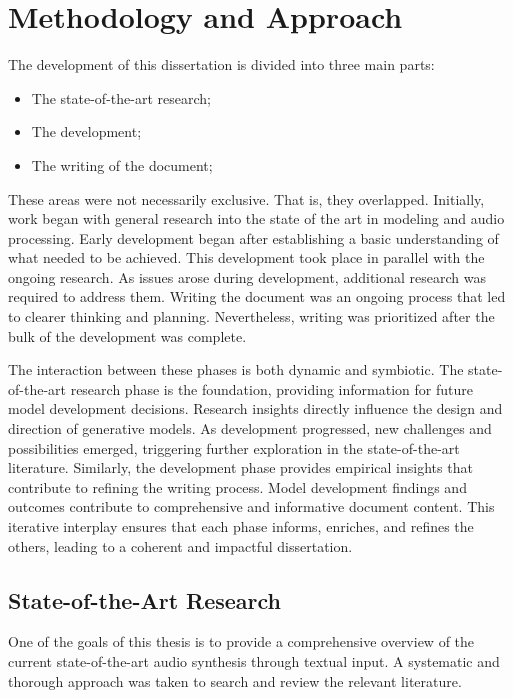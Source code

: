\section{Methodology and Approach} \label{sec:sol-approach}
 
The development of this dissertation is divided into three main parts:

\begin{itemize}
    \item The state-of-the-art research;
    \item The development;
    \item The writing of the document;
\end{itemize}
 
These areas were not necessarily exclusive. That is, they overlapped. Initially, work began with general research into the state of the art in modeling and audio processing. Early development began after establishing a basic understanding of what needed to be achieved. This development took place in parallel with the ongoing research. As issues arose during development, additional research was required to address them. Writing the document was an ongoing process that led to clearer thinking and planning. Nevertheless, writing was prioritized after the bulk of the development was complete.

The interaction between these phases is both dynamic and symbiotic. The state-of-the-art research phase is the foundation, providing information for future model development decisions. Research insights directly influence the design and direction of generative models. As development progressed, new challenges and possibilities emerged, triggering further exploration in the state-of-the-art literature. Similarly, the development phase provides empirical insights that contribute to refining the writing process. Model development findings and outcomes contribute to comprehensive and informative document content. This iterative interplay ensures that each phase informs, enriches, and refines the others, leading to a coherent and impactful dissertation.

\subsection{State-of-the-Art Research}

One of the goals of this thesis is to provide a comprehensive overview of the current state-of-the-art audio synthesis through textual input. A systematic and thorough approach was taken to search and review the relevant literature.

